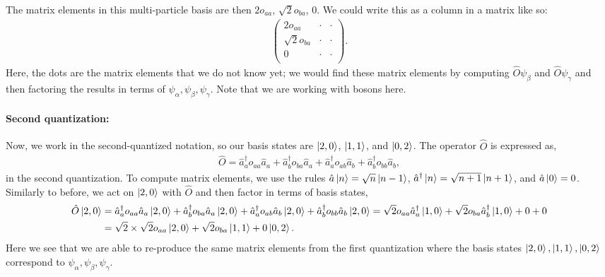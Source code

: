 \documentclass[10pt]{article}
\newcommand{\1}{\mathbf 1}
\begin{document}
The matrix elements in this multi-particle basis are then $2o_{aa}$, $\sqrt{2}o_{ba}$, $0$.
We could write this as a column in a matrix like so:
\begin{align}
	\left(
		\begin{array}{ccc}
			2 o_{aa} & \cdot & \cdot\\
			\sqrt{2} o_{ba} & \cdot & \cdot\\
			0 & \cdot & \cdot\\
		\end{array}
	\right).
\end{align}
Here, the dots are the matrix elements that we do not know yet; we would find these matrix elements by computing $\hat O \psi_\beta$ and $\hat O \psi_\gamma$ and then factoring the results in terms of $\psi_\alpha, \psi_\beta, \psi_\gamma$.
Note that we are working with bosons here.

\paragraph{Second quantization:}

Now, we work in the second-quantized notation, so our basis states are $\ket{2,0}$, $\ket{1,1}$, and $\ket{0,2}$.
The operator $\hat O$ is expressed as,
\begin{align}
	\hat O =
	\hat a_a^\dagger
	o_{aa}
	\hat a_a
	+
	\hat a_b^\dagger
	o_{ba}
	\hat a_a
	+
	\hat a_a^\dagger
	o_{ab}
	\hat a_b
	+
	\hat a_b^\dagger
	o_{bb}
	\hat a_b,
\end{align}
in the second quantization.
To compute matrix elements, we use the rules $\hat a \ket{n} = \sqrt{n} \ket{n-1}$, $\hat a^\dagger \ket{n} = \sqrt{n+1} \ket{n+1}$, and $\hat a\ket{0} = 0$.
Similarly to before, we act on $\ket{2,0}$ with $\hat O$ and then factor in terms of basis states,
\begin{align}
	\hat O \ket{2,0}
	&=\nonumber
	\hat a_a^\dagger
	o_{aa}
	\hat a_a
	\ket{2,0}
	+
	\hat a_b^\dagger
	o_{ba}
	\hat a_a
	\ket{2,0}
	+
	\hat a_a^\dagger
	o_{ab}
	\hat a_b
	\ket{2,0}
	+
	\hat a_b^\dagger
	o_{bb}
	\hat a_b
	\ket{2,0}
	=
	\sqrt{2}
	o_{aa}
	\hat a_a^\dagger
	\ket{1,0}
	+
	\sqrt{2}
	o_{ba}
	\hat a_b^\dagger
	\ket{1,0}
	+
	0
	+
	0
	\\
	&=
	\sqrt{2} \times \sqrt{2} o_{aa} \ket{2,0}
	+
	\sqrt{2}
	o_{ba}
	\ket{1,1}
	+
	0 \ket{0,2}.
\end{align}
Here we see that we are able to re-produce the same matrix elements from the first quantization where the basis states $\ket{2,0}, \ket{1,1},\ket{0,2}$ correspond to $\psi_\alpha,\psi_\beta,\psi_\gamma$.
\end{document}
